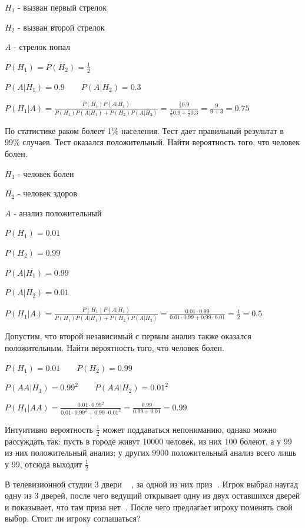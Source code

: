 \documentclass[12pt]{article}
\begin{document}
    $H_1$ - вызван первый стрелок

    $H_2$ - вызван второй стрелок

    $A$ - стрелок попал

    $P(H_1) = P(H_2) = \frac{1}{2}$

    $P(A|H_1) = 0.9 \quad\quad P(A|H_2) = 0.3$

    $P(H_1 | A) = \frac{P(H_1) P(A|H_1)}{P(H_1) P(A|H_1) + P(H_2) P(A | H_2)} = \frac{\frac{1}{2} 0.9}{\frac{1}{2} 0.9 + \frac{1}{2} 0.3} = \frac{9}{9 + 3} = 0.75$

     По статистике раком болеет 1\% населения. Тест дает правильный результат в 99\% случаев. Тест оказался положительный. Найти вероятность того, что человек болен.

    $H_1$ - человек болен

    $H_2$ - человек здоров

    $A$ - анализ положительный

    $P(H_1) = 0.01$

    $P(H_2) = 0.99$

    $P(A|H_1) = 0.99$

    $P(A|H_2) = 0.01$

    $P(H_1 | A) = \frac{P(H_1)P(A | H_1)}{P(H_1) P(A | H_1) + P(H_2) P(A | H_2)} = \frac{0.01 \cdot 0.99}{0.01 \cdot 0.99 + 0.99 \cdot 0.01} = \frac{1}{2} = 0.5$

    Допустим, что второй независимый с первым анализ также оказался положительным. Найти вероятность того, что человек болен.

    $P(H_1) = 0.01 \quad\quad P(H_2) = 0.99$

    $P(AA|H_1) = 0.99^2 \quad\quad P(AA|H_2) = 0.01^2$

    $P(H_1 | AA) = \frac{0.01 \cdot 0.99^2}{0.01 \cdot 0.99^2 + 0.99 \cdot 0.01^2} = \frac{0.99}{0.99 + 0.01} = 0.99$

    Интуитивно вероятность $\frac{1}{2}$ может поддаваться непониманию, однако можно рассуждать так:
    пусть в городе живут 10000 человек, из них 100 болеют, а у 99 из них положительный анализ; у других 9900 положительный анализ всего лишь у 99, отсюда выходит $\frac{1}{2}$

     В телевизионной студии 3 двери {\Large 🚪🚪🚪}, за одной из них приз {\Large 🚗}.
    Игрок выбрал наугад одну из 3 дверей, после чего ведущий открывает одну из двух оставшихся дверей и показывает, что там приза нет {\Large 🛴}. После чего
    предлагает игроку поменять свой выбор. Стоит ли игроку соглашаться?
\end{document}
